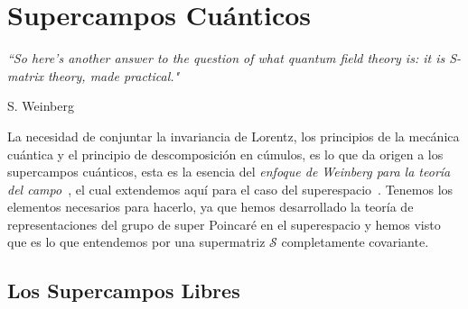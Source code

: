 \chapter{Supercampos Cuánticos}
\label{Chap5}
\epigraph{\textit{``So here’s another answer to the question of what quantum field theory is: it
is S-matrix theory, made practical."}}{S. Weinberg~\cite{Weinberg:1996kw}}
 La necesidad de conjuntar la invariancia de Lorentz, los principios de la mecánica cuántica y el principio de descomposición en cúmulos,  es lo que da origen a los supercampos cuánticos, esta es la esencia del \emph{enfoque de Weinberg para la teoría del campo}~\cite{Weinberg:1964cn,Weinberg:1969di}, el cual extendemos aquí para el caso del superespacio~\cite{Jimenez:2014gfa}.  Tenemos los elementos necesarios para hacerlo, ya que hemos desarrollado la teoría de representaciones del grupo de super Poincar\'e en el superespacio y hemos visto que es lo que entendemos por una supermatriz $ \mathcal{S} $ completamente covariante.  

\section{Los Supercampos Libres}
\label{chap5:1}

